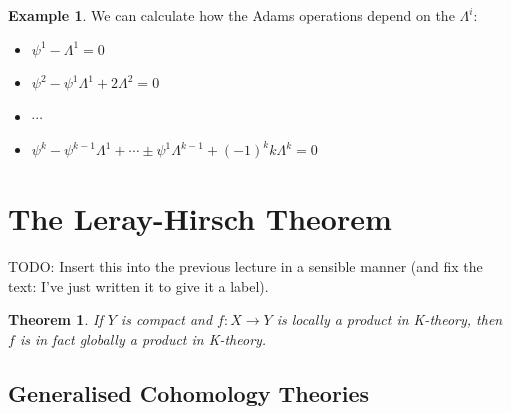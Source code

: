 \documentclass[a4paper,10pt]{article}
\theoremstyle{plain}%
\newtheorem{thm}{Theorem}
\theoremstyle{definition}
\newtheorem{exmp}{Example}
\theoremstyle{remark}
\begin{document}
\begin{exmp}
We can calculate how the Adams operations depend on the $\Lambda^i$:
\begin{itemize}
\item $\psi^1-\Lambda^1=0$
\item $\psi^2-\psi^1\Lambda^1+2\Lambda^2=0$
\item $\cdots$
\item $\psi^k-\psi^{k-1}\Lambda^1+\cdots\pm\psi^1\Lambda^{k-1}+(-1)^kk\Lambda^k=0$

\end{itemize}
\end{exmp}

\section{The Leray-Hirsch Theorem}
TODO: Insert this into the previous lecture in a sensible manner (and
fix the text: I've just written it to give it a label).
\begin{thm}\label{local-to-global-product}
  If $Y$ is compact and $f: X\to Y$ is locally a product in K-theory,
  then $f$ is in fact globally a product in K-theory.
\end{thm}

\subsection{Generalised Cohomology Theories}
\end{document}

